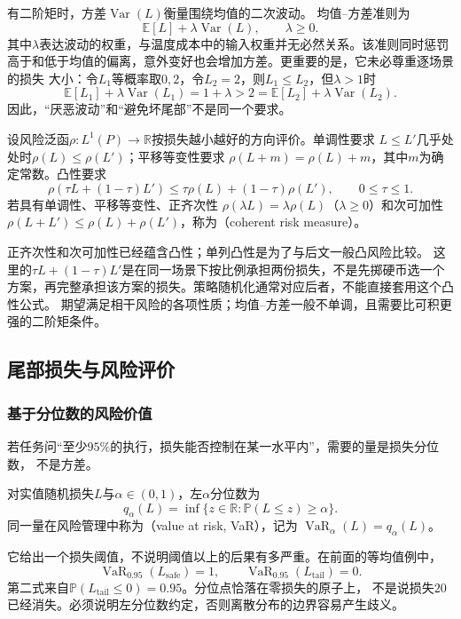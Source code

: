 有二阶矩时，方差$\operatorname{Var}(L)$衡量围绕均值的二次波动。
均值--方差准则为
\[
  \mathbb E[L]+\lambda\operatorname{Var}(L),\qquad \lambda\geq0.
\]
其中$\lambda$表达波动的权重，与温度成本中的输入权重并无必然关系。该准则同时惩罚
高于和低于均值的偏离，意外变好也会增加方差。更重要的是，它未必尊重逐场景的损失
大小：令$L_1$等概率取$0,2$，令$L_2=2$，则$L_1\leq L_2$，但$\lambda>1$时
\[
  \mathbb E[L_1]+\lambda\operatorname{Var}(L_1)=1+\lambda>2
  =\mathbb E[L_2]+\lambda\operatorname{Var}(L_2).
\]
因此，“厌恶波动”和“避免坏尾部”不是同一个要求。

\begin{definition}[相干风险]
\label{def:decision-coherent-risk}
设风险泛函$\rho:L^1(P)\to\mathbb R$按损失越小越好的方向评价。单调性要求
$L\leq L'$几乎处处时$\rho(L)\leq\rho(L')$；平移等变性要求
$\rho(L+m)=\rho(L)+m$，其中$m$为确定常数。凸性要求
\[
  \rho(\tau L+(1-\tau)L')
  \leq\tau\rho(L)+(1-\tau)\rho(L'),\qquad 0\leq\tau\leq1.
\]
若具有单调性、平移等变性、正齐次性
$\rho(\lambda L)=\lambda\rho(L)$（$\lambda\geq0$）和次可加性
$\rho(L+L')\leq\rho(L)+\rho(L')$，称为（coherent risk measure）。
\end{definition}

正齐次性和次可加性已经蕴含凸性；单列凸性是为了与后文一般凸风险比较。
这里的$\tau L+(1-\tau)L'$是在同一场景下按比例承担两份损失，不是先掷硬币选一个
方案，再完整承担该方案的损失。策略随机化通常对应后者，不能直接套用这个凸性公式。
期望满足相干风险的各项性质；均值--方差一般不单调，且需要比可积更强的二阶矩条件。

\subsection{尾部损失与风险评价}

\subsubsection{基于分位数的风险价值}

若任务问“至少$95\%$的执行，损失能否控制在某一水平内”，需要的量是损失分位数，
不是方差。
\begin{definition}[风险价值]
\label{def:decision-value-at-risk}
对实值随机损失$L$与$\alpha\in(0,1)$，左$\alpha$分位数为
\begin{equation}
  q_\alpha(L)=\inf\{z\in\mathbb R:\mathbb P(L\leq z)\geq\alpha\}.
  \label{eq:decision-loss-quantile}
\end{equation}
同一量在风险管理中称为（value at risk, VaR），记为
$\operatorname{VaR}_\alpha(L)=q_\alpha(L)$。
\end{definition}
它给出一个损失阈值，不说明阈值以上的后果有多严重。在前面的等均值例中，
\[
  \operatorname{VaR}_{0.95}(L_{\mathrm{safe}})=1,\qquad
  \operatorname{VaR}_{0.95}(L_{\mathrm{tail}})=0.
\]
第二式来自$\mathbb P(L_{\mathrm{tail}}\leq0)=0.95$。分位点恰落在零损失的原子上，
不是说损失$20$已经消失。必须说明左分位数约定，否则离散分布的边界容易产生歧义。

